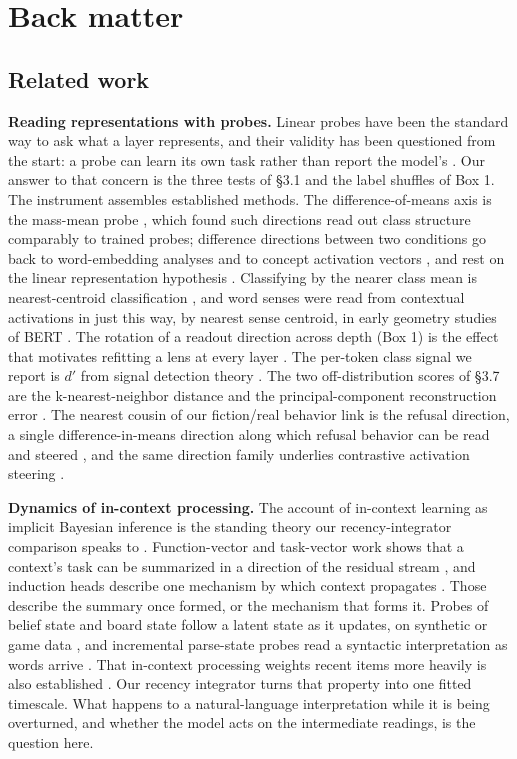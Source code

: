\documentclass[11pt]{article}
\begin{document}
\section*{Back matter}

\subsection*{Related work}

\textbf{Reading representations with probes.} Linear probes have been the standard way to
ask what a layer represents, and their validity has been questioned from the start:
a probe can learn its own task rather than report the model's \citep{alain2016,hewitt2019,belinkov2022}. Our answer to that concern is the three tests of \S3.1
and the label shuffles of Box 1. The instrument assembles established methods. The difference-of-means axis is the
mass-mean probe \citep{marks2024}, which found such directions read out class
structure comparably to trained probes; difference directions between two
conditions go back to word-embedding analyses \citep{bolukbasi2016} and to
concept activation vectors \citep{kim2018}, and rest on the linear
representation hypothesis \citep{park2024}. Classifying by the nearer class mean is nearest-centroid classification \citep{tibshirani2002}, and word senses were read from contextual activations in
just this way, by nearest sense centroid, in early geometry studies of BERT \citep{reif2019}. The rotation of a readout direction across depth (Box 1) is the
effect that motivates refitting a lens at every layer \citep{belrose2023}. The per-token class signal we report is $d'$ from signal detection theory
\citep{green1966}. The two off-distribution scores of \S3.7 are the
k-nearest-neighbor distance \citep{sun2022,lee2018} and the
principal-component reconstruction error \citep{jackson1979}. The
nearest cousin of our fiction/real behavior link is the refusal direction, a single
difference-in-means direction along which refusal behavior can be read and steered
\citep{arditi2024}, and the same direction family underlies contrastive
activation steering \citep{panickssery2024}.

\textbf{Dynamics of in-context processing.} The account of in-context learning as
implicit Bayesian inference is the standing theory our recency-integrator comparison
speaks to \citep{xie2022}. Function-vector and task-vector work shows that a
context's task can be summarized in a direction of the residual stream \citep{hendel2023,todd2024}, and induction heads describe one mechanism by which
context propagates \citep{olsson2022}. Those describe the summary once formed, or the mechanism that forms it. Probes of
belief state and board state follow a latent state as it updates, on synthetic or
game data \citep{shai2024,li2023othello}, and incremental parse-state
probes read a syntactic interpretation as words arrive \citep{eisape2022}.
That in-context processing weights recent items more heavily is also established
\citep{zhao2021,liu2024lost}. Our recency integrator turns that property
into one fitted timescale. What happens to a natural-language interpretation while
it is being overturned, and whether the model acts on the intermediate readings, is
the question here.
\end{document}
